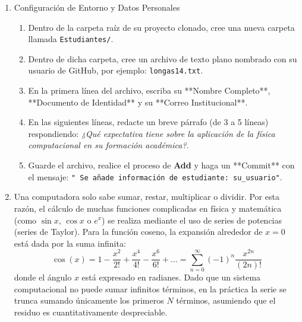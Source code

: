 \documentclass[12pt]{article}
\begin{document}
\begin{problemas}[]
    \begin{enumerate}
        \item Configuración de Entorno y Datos Personales
     \begin{enumerate}
    \item Dentro de la carpeta raíz de su proyecto clonado, cree una nueva carpeta 
        llamada \texttt{Estudiantes/}.
    \item Dentro de dicha carpeta, cree un archivo de texto plano nombrado con su 
    usuario de GitHub, por ejemplo: \texttt{longas14.txt}.
    \item En la primera línea del archivo, escriba su **Nombre Completo**, 
    **Documento de Identidad** y su **Correo Institucional**.
    \item En las siguientes líneas, redacte un breve párrafo (de 3 a 5 líneas) 
    respondiendo: \emph{¿Qué expectativa tiene sobre la aplicación de la física 
    computacional en su formación académica?}.
    \item Guarde el archivo, realice el proceso de \textbf{Add} y haga un 
    **Commit** con el mensaje: \texttt{" Se añade información de estudiante: su\_usuario"}.
\end{enumerate}

\item Una computadora solo sabe sumar, restar, multiplicar o dividir. Por esta razón, el cálculo de muchas funciones complicadas en física y matemática (como $\sin x$, $\cos x$ o $e^x$) se realiza mediante el uso de series de potencias (series de Taylor). Para la función coseno, la expansión alrededor de $x = 0$ está dada por la suma infinita:
\[
    \cos(x) = 1 - \frac{x^2}{2!} + \frac{x^4}{4!} - \frac{x^6}{6!} + \dots = \sum_{n=0}^{\infty} (-1)^n \frac{x^{2n}}{(2n)!}
\]
donde el ángulo $x$ está expresado en radianes. Dado que un sistema computacional no puede sumar infinitos términos, en la práctica la serie se trunca sumando únicamente los primeros $N$ términos, asumiendo que el residuo es cuantitativamente despreciable.


\end{enumerate}
\end{problemas}
\end{document}
